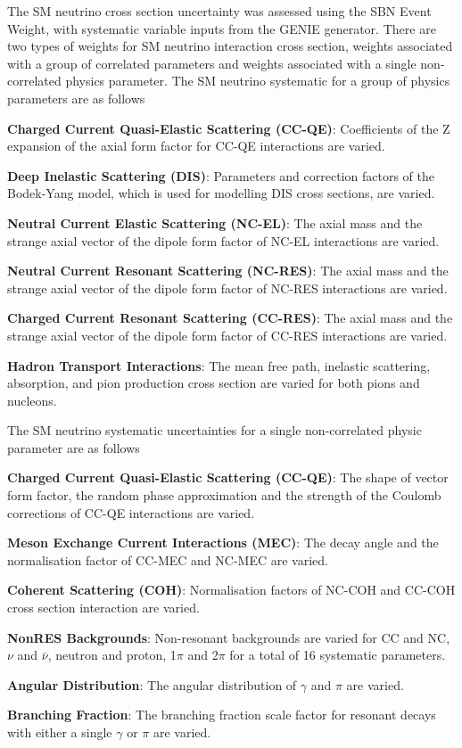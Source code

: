 The SM neutrino cross section uncertainty was assessed using the SBN Event Weight, with systematic variable inputs from the GENIE generator.
There are two types of weights for SM neutrino interaction cross section, weights associated with a group of correlated parameters and weights associated with a single non-correlated physics parameter.
The SM neutrino systematic for a group of physics parameters are as follows
\begin{coloritemize}
\item\textbf{Charged Current Quasi-Elastic Scattering (CC-QE)}: Coefficients of the Z expansion of the axial form factor for CC-QE interactions are varied.
\item\textbf{Deep Inelastic Scattering (DIS)}: Parameters and correction factors of the Bodek-Yang model, which is used for modelling DIS cross sections, are varied. 
\item\textbf{Neutral Current Elastic Scattering (NC-EL)}: The axial mass and the strange axial vector of the dipole form factor of NC-EL interactions are varied.
\item\textbf{Neutral Current Resonant Scattering (NC-RES)}: The axial mass and the strange axial vector of the dipole form factor of NC-RES interactions are varied.
\item\textbf{Charged Current Resonant Scattering (CC-RES)}: The axial mass and the strange axial vector of the dipole form factor of CC-RES interactions are varied.
\item\textbf{Hadron Transport Interactions}: The mean free path, inelastic scattering, absorption, and pion production cross section are varied for both pions and nucleons.
\end{coloritemize}
The SM neutrino systematic uncertainties for a single non-correlated physic parameter are as follows
\begin{coloritemize}
\item\textbf{Charged Current Quasi-Elastic Scattering (CC-QE)}: The shape of vector form factor, the random phase approximation and the strength of the Coulomb corrections of CC-QE interactions are varied.
\item\textbf{Meson Exchange Current Interactions (MEC)}: The decay angle and the normalisation factor of CC-MEC and NC-MEC are varied.
\item\textbf{Coherent Scattering (COH)}: Normalisation factors of NC-COH and CC-COH cross section interaction are varied.
\item\textbf{NonRES Backgrounds}: Non-resonant backgrounds are varied for CC and NC, $\nu$ and $\bar{\nu}$, neutron and proton, 1$\pi$ and 2$\pi$ for a total of 16 systematic parameters.
\item\textbf{Angular Distribution}: The angular distribution of $\gamma$ and $\pi$ are varied.
\item\textbf{Branching Fraction}: The branching fraction scale factor for resonant  decays with either a single $\gamma$ or $\pi$ are varied.
\end{coloritemize}
